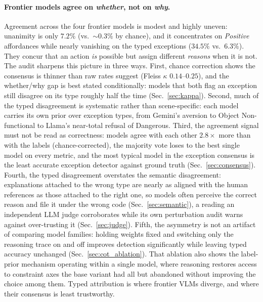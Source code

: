 \documentclass[runningheads]{llncs}
\begin{document}
\paragraph{Frontier models agree on \emph{whether}, not on \emph{why}.}
Agreement across the four frontier models is modest and highly uneven: unanimity is only $7.2\%$ (vs.\ ${\sim}0.3\%$ by chance), and it concentrates on \emph{Positive} affordances while nearly vanishing on the typed exceptions ($34.5\%$ vs.\ $\!6.3\%$).
They concur that an action \emph{is} possible but assign different \emph{reasons} when it is not.
The audit sharpens this picture in three ways.
First, chance correction shows the consensus is thinner than raw rates suggest (Fleiss $\kappa$ $0.14$--$0.25$), and the whether/why gap is best stated conditionally: models that both flag an exception still disagree on its type roughly half the time (Sec.~\ref{sec:kappa}).
Second, much of the typed disagreement is systematic rather than scene-specific: each model carries its own prior over exception types, from Gemini's aversion to Object Non-functional to Llama's near-total refusal of Dangerous.
Third, the agreement signal must not be read as correctness: models agree with each other $2.8\times$ more than with the labels (chance-corrected), the majority vote loses to the best single model on every metric, and the most typical model in the exception consensus is the least accurate exception detector against ground truth (Sec.~\ref{sec:consensus}).
Fourth, the typed disagreement overstates the semantic disagreement: explanations attached to the wrong type are nearly as aligned with the human references as those attached to the right one, so models often perceive the correct reason and file it under the wrong code (Sec.~\ref{sec:semantic}), a reading an independent LLM judge corroborates while its own perturbation audit warns against over-trusting it (Sec.~\ref{sec:judge}).
Fifth, the asymmetry is not an artifact of comparing model families: holding weights fixed and switching only the reasoning trace on and off improves detection significantly while leaving typed accuracy unchanged (Sec.~\ref{sec:cot_ablation}).
That ablation also shows the label-prior mechanism operating within a single model, where reasoning restores access to constraint axes the base variant had all but abandoned without improving the choice among them.
Typed attribution is where frontier VLMs diverge, and where their consensus is least trustworthy.
\end{document}
